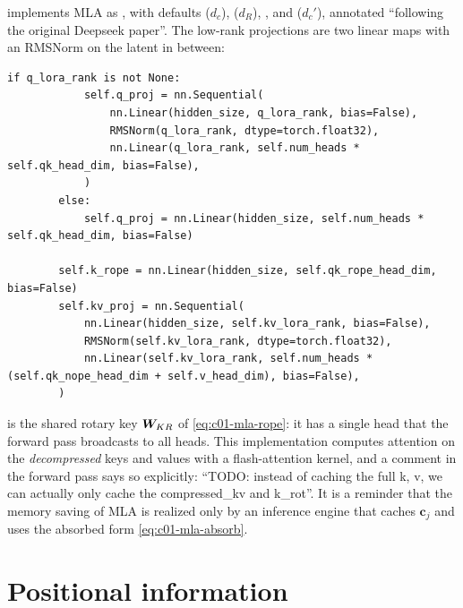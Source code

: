 \begin{implnote}[title={In the code: MLA in \textsf{fla}}]
 implements MLA as
, with defaults  ($d_c$),
 ($d_R$), ,  and
 ($d_c'$), annotated ``following the original Deepseek paper''. The
low-rank projections are two linear maps with an RMSNorm on the latent in between:
\begin{lstlisting}[caption={Excerpt from \texttt{repos/\allowbreak fla-org\_\_flash-linear-attention/\allowbreak fla/\allowbreak layers/\allowbreak mla.py}},label={lst:c01-fla-mla}]
        if q_lora_rank is not None:
            self.q_proj = nn.Sequential(
                nn.Linear(hidden_size, q_lora_rank, bias=False),
                RMSNorm(q_lora_rank, dtype=torch.float32),
                nn.Linear(q_lora_rank, self.num_heads * self.qk_head_dim, bias=False),
            )
        else:
            self.q_proj = nn.Linear(hidden_size, self.num_heads * self.qk_head_dim, bias=False)

        self.k_rope = nn.Linear(hidden_size, self.qk_rope_head_dim, bias=False)
        self.kv_proj = nn.Sequential(
            nn.Linear(hidden_size, self.kv_lora_rank, bias=False),
            RMSNorm(self.kv_lora_rank, dtype=torch.float32),
            nn.Linear(self.kv_lora_rank, self.num_heads * (self.qk_nope_head_dim + self.v_head_dim), bias=False),
        )
\end{lstlisting}
 is the shared rotary key $\bm{W}_{KR}$ of \eqref{eq:c01-mla-rope}: it has a
single head that the forward pass broadcasts to all heads. This implementation computes
attention on the \emph{decompressed} keys and values with a flash-attention kernel, and a
comment in the forward pass says so explicitly: ``TODO: instead of caching the full k, v, we
can actually only cache the compressed\_kv and k\_rot''. It is a reminder that the memory
saving of MLA is realized only by an inference engine that caches $\bm{c}_j$ and uses the
absorbed form \eqref{eq:c01-mla-absorb}.
\end{implnote}

\section{Positional information}\label{sec:c01-position}

